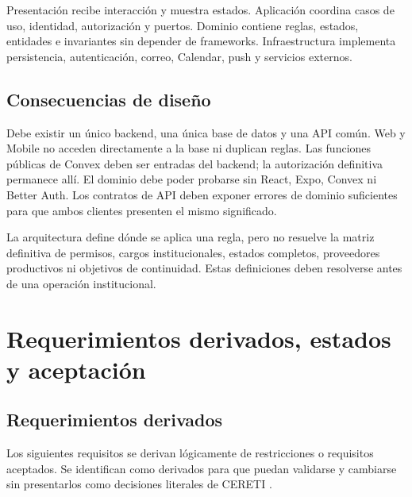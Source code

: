 \documentclass[10pt,a4paper,oneside]{article}
\begin{document}
Presentación recibe interacción y muestra estados. Aplicación coordina casos de uso, identidad, autorización y puertos. Dominio contiene reglas, estados, entidades e invariantes sin depender de frameworks. Infraestructura implementa persistencia, autenticación, correo, Calendar, push y servicios externos.

\subsection{Consecuencias de diseño}

Debe existir un único backend, una única base de datos y una API común. Web y Mobile no acceden directamente a la base ni duplican reglas. Las funciones públicas de Convex deben ser entradas del backend; la autorización definitiva permanece allí. El dominio debe poder probarse sin React, Expo, Convex ni Better Auth. Los contratos de API deben exponer errores de dominio suficientes para que ambos clientes presenten el mismo significado.

La arquitectura define dónde se aplica una regla, pero no resuelve la matriz definitiva de permisos, cargos institucionales, estados completos, proveedores productivos ni objetivos de continuidad. Estas definiciones deben resolverse antes de una operación institucional.
\clearpage
\section{Requerimientos derivados, estados y aceptación}

\subsection{Requerimientos derivados}

Los siguientes requisitos se derivan lógicamente de restricciones o requisitos aceptados. Se identifican como derivados para que puedan validarse y cambiarse sin presentarlos como decisiones literales de CERETI \citep{swebok}.
\end{document}
